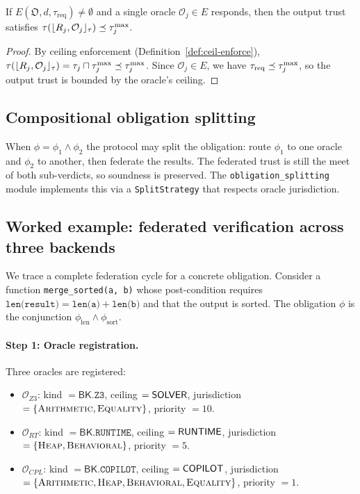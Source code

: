 \documentclass[11pt]{article}
\newcommand{\Oracle}{\mathcal{O}}            %
\newcommand{\OrcSet}{\mathfrak{O}}           %
\newcommand{\Orcl}[1]{\Oracle_{#1}}         %
\newcommand{\tlev}[1]{\tau(#1)}              %
\newcommand{\tmin}{\sqcap}                   %
\newcommand{\Ceil}[1]{\lfloor #1 \rfloor_{\tau}}   %
\newcommand{\BK}{\mathsf{BK}}               %
\begin{document}
\begin{proposition}\label{prop:eligible-sound}
  If $E(\OrcSet, d, \tau_{\mathrm{req}}) \neq \emptyset$ and a single
  oracle $\Orcl{j} \in E$ responds, then the output trust satisfies
  $\tlev{\Ceil{R_j, \Orcl{j}}} \tleq \tau_j^{\max}$.
\end{proposition}
\begin{proof}
  By ceiling enforcement (Definition~\ref{def:ceil-enforce}),
  $\tlev{\Ceil{R_j, \Orcl{j}}} = \tau_j \tmin \tau_j^{\max}
  \tleq \tau_j^{\max}$.  Since $\Orcl{j} \in E$, we have
  $\tau_{\mathrm{req}} \preceq \tau_j^{\max}$, so the output trust
  is bounded by the oracle's ceiling.
\end{proof}

\subsection{Compositional obligation splitting}

When $\phi = \phi_1 \wedge \phi_2$ the protocol may split the
obligation: route $\phi_1$ to one oracle and $\phi_2$ to another, then
federate the results.  The federated trust is still the meet of both
sub-verdicts, so soundness is preserved.  The
\texttt{obligation\_splitting} module implements this via a
\texttt{SplitStrategy} that respects oracle jurisdiction.

\subsection{Worked example: federated verification across three backends}
\label{sec:worked-example}

We trace a complete federation cycle for a concrete obligation.  Consider
a function \texttt{merge\_sorted(a, b)} whose post-condition requires
$\texttt{len(result)} = \texttt{len(a)} + \texttt{len(b)}$ and that the
output is sorted.  The obligation $\phi$ is the conjunction
$\phi_{\mathrm{len}} \wedge \phi_{\mathrm{sort}}$.

\paragraph{Step 1: Oracle registration.}
Three oracles are registered:
\begin{itemize}[nosep]
  \item $\Orcl{Z3}$: kind $= \BK.\texttt{Z3}$, ceiling $= \mathsf{SOLVER}$,
        jurisdiction $= \{\textsc{Arithmetic}, \textsc{Equality}\}$,
        priority $= 10$.
  \item $\Orcl{RT}$: kind $= \BK.\texttt{RUNTIME}$, ceiling $= \mathsf{RUNTIME}$,
        jurisdiction $= \{\textsc{Heap}, \textsc{Behavioral}\}$,
        priority $= 5$.
  \item $\Orcl{CPL}$: kind $= \BK.\texttt{COPILOT}$, ceiling $= \mathsf{COPILOT}$,
        jurisdiction $= \{\textsc{Arithmetic}, \textsc{Heap},
        \textsc{Behavioral}, \textsc{Equality}\}$,
        priority $= 1$.
\end{itemize}
\end{document}
